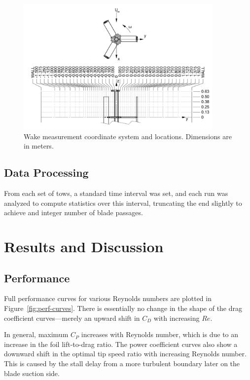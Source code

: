 \documentclass[energies,article,accept,moreauthors,pdftex,12pt,a4paper]{mdpi}
\begin{document}
\begin{figure}
\centering
\includegraphics[width=0.9\textwidth]{figures/turbine_coordinate_system}
\caption{Wake measurement coordinate system and locations. Dimensions are in
meters.} 
\label{fig:wake-locations}
\end{figure}

\subsection{Data Processing}

From each set of tows, a standard time interval was set, and each run was
analyzed to compute statistics over this interval, truncating the end slightly
to achieve and integer number of blade passages.



\section{Results and Discussion}


\subsection{Performance}

Full performance curves for various Reynolds numbers are plotted in
Figure~\ref{fig:perf-curves}. There is essentially no change in the shape of the
drag coefficient curves---merely an upward shift in $C_D$ with increasing $Re$.

In general, maximum $C_P$ increases with Reynolds number, which is due to an
increase in the foil lift-to-drag ratio. The power coefficient curves also show
a downward shift in the optimal tip speed ratio with increasing Reynolds number.
This is caused by the stall delay from a more turbulent boundary later on the
blade suction side.
\end{document}
